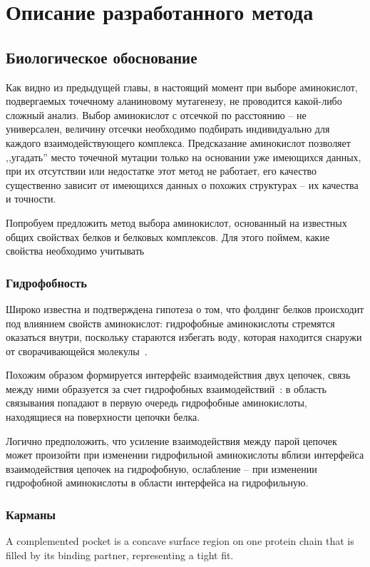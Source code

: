\graphicspath{{../images/algorithm/}}
\chapter{Описание разработанного метода}

\section{Биологическое обоснование}
Как видно из предыдущей главы,  в настоящий момент при выборе аминокислот, подвергаемых точечному аланиновому мутагенезу, не проводится какой-либо сложный анализ. Выбор аминокислот с отсечкой по расстоянию -- не универсален, величину отсечки необходимо подбирать индивидуально для каждого взаимодействующего комплекса. Предсказание аминокислот позволяет ,,угадать'' место точечной мутации только на основании уже имеющихся данных, при их отсутствии или недостатке этот метод не работает, его качество существенно зависит от имеющихся данных о похожих структурах -- их качества и точности. 

Попробуем предложить метод выбора аминокислот, основанный на известных общих свойствах белков и белковых комплексов. Для этого поймем, какие свойства необходимо учитывать


\subsection{Гидрофобность}
Широко известна и подтверждена гипотеза о том, что фолдинг белков происходит под влиянием свойств аминокислот: гидрофобные аминокислоты стремятся оказаться внутри, поскольку стараются избегать воду, которая находится снаружи от сворачивающейся молекулы~\cite{hydrophobic}.

Похожим образом формируется интерфейс взаимодействия двух цепочек, связь между ними образуется за счет гидрофобных взаимодействий~\cite{hydrophobic2chain}: в область связывания попадают в первую очередь гидрофобные аминокислоты, находящиеся на поверхности цепочки белка.

Логично предположить, что усиление взаимодействия между парой цепочек может произойти при изменении гидрофильной аминокислоты вблизи интерфейса взаимодействия цепочек на гидрофобную, ослабление -- при изменении гидрофобной аминокислоты в области интерфейса на гидрофильную.

\subsection{Карманы}
A complemented pocket is a concave surface
region on one protein chain that is filled by its
binding partner, representing a tight fit.
\cite{pockets2004}
